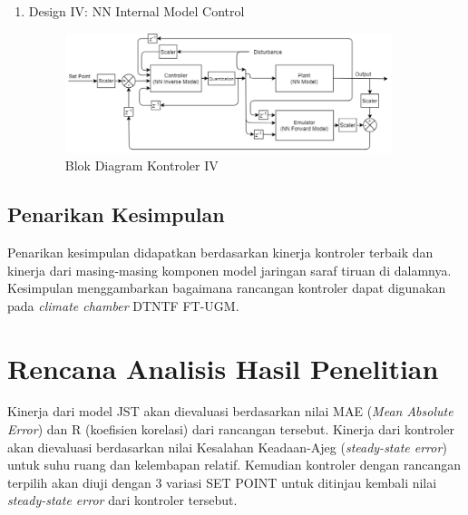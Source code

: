 \begin{enumerate}
	\item Design IV: NN Internal Model Control\cite{paper42Hussain}
	\begin{figure}[!h]
		\centering
		\includegraphics[width=0.9\textwidth]{figures/ControlDesignDiagram}
		\caption{Blok Diagram Kontroler IV}
		\label{fig:4:ConstrolSystemBlockDiagram}
	\end{figure}
\end{enumerate}



\subsection{{Penarikan Kesimpulan}}
Penarikan kesimpulan didapatkan berdasarkan kinerja kontroler terbaik dan kinerja dari masing-masing komponen model jaringan saraf tiruan di dalamnya. Kesimpulan menggambarkan bagaimana rancangan kontroler dapat digunakan pada \textit{climate chamber} DTNTF FT-UGM.

\section{Rencana Analisis Hasil Penelitian}
Kinerja dari model JST akan dievaluasi berdasarkan nilai MAE (\textit{Mean Absolute Error}) dan R (koefisien korelasi) dari rancangan tersebut. Kinerja dari kontroler akan dievaluasi berdasarkan nilai Kesalahan Keadaan-Ajeg (\textit{steady-state error}) untuk suhu ruang dan kelembapan relatif. Kemudian kontroler dengan rancangan terpilih akan diuji dengan 3 variasi SET POINT untuk ditinjau kembali nilai \textit{steady-state error} dari kontroler tersebut.